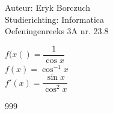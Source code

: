\documentclass[a4paper]{article}
\begin{document}
  
\noindent \large Auteur: Eryk Borczuch \\
\noindent \large Studierichting: Informatica\\
\noindent \large Oefeningenreeks 3A nr. 23.8\\

\medskip

\normalsize

$f(x() = \dfrac{1}{\cos x}$\\

$f(x) = \cos ^{-1}x$\\

$f'(x) = \dfrac{\sin x}{\cos ^2 x}$\\

\begin{thebibliography}{999}
\end{thebibliography}
\end{document}
